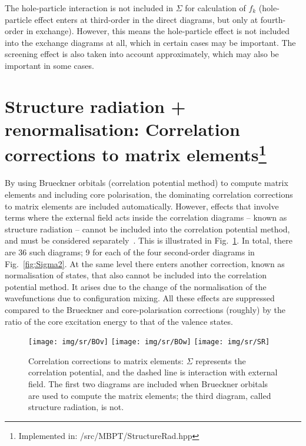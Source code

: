 \documentclass[10pt,twocolumn,a4paper]{article}%
\begin{document}
The hole-particle interaction is not included in $\Sigma$ for calculation of $f_k$
(hole-particle effect enters at third-order in the direct diagrams, but only at fourth-order in exchange).
However, this means the hole-particle effect is not included into the exchange diagrams at all, which in certain cases may be important.
The screening effect is also taken into account approximately, which may also be important in some cases.










\section[Structure radiation + renormalisation]{Structure radiation + renormalisation: Correlation corrections to matrix elements\footnote{Implemented in: /src/MBPT/StructureRad.hpp}}

By using Brueckner orbitals (correlation potential method) to compute matrix elements and including core polarisation, the dominating correlation corrections to matrix elements are included automatically.
However, effects that involve terms where the external field acts {\rm inside} the correlation diagrams -- known as structure radiation -- cannot be included into the correlation potential method, and must be considered separately~\cite{Blundell1987,Dzuba1987jpbRPA}.
This is illustrated in Fig.~\ref{fig:SR1}.
In total, there are 36 such diagrams; 9 for each of the four second-order diagrams in Fig.~\ref{fig:Sigma2}.
At the same level there enters another correction, known as normalisation of states, that also cannot be included into the correlation potential method.
It arises due to the change of the normalisation of the wavefunctions due to configuration mixing.
All these effects are suppressed compared to the Brueckner and core-polarisation corrections (roughly) by the ratio of the core excitation energy to that of the valence states.

\begin{figure}%
\centering
\texttt{[image: img/sr/BOv]}
\texttt{[image: img/sr/BOw]}
\texttt{[image: img/sr/SR]}
\caption{\label{fig:SR1}\small Correlation corrections to matrix elements: $\Sigma$ represents the correlation potential, and the dashed line is interaction with external field. The first two diagrams are included when Brueckner orbitals are used to compute the matrix elements; the third diagram, called structure radiation, is not.}
\end{figure}
\end{document}
